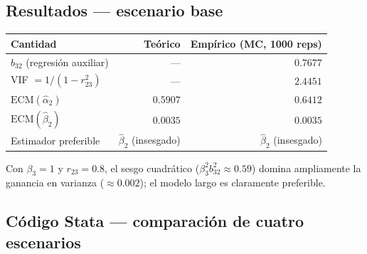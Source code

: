 \documentclass[12pt, letterpaper]{article}
\begin{document}
\subsection{Resultados --- escenario base}

\begin{center}
\renewcommand{\arraystretch}{1.3}
\small
\begin{tabular}{lrr}
\toprule
\textbf{Cantidad} & \textbf{Teórico} & \textbf{Empírico (MC, 1000 reps)} \\
\midrule
$b_{32}$ (regresión auxiliar)        & ---      & $0.7677$ \\
VIF $= 1/(1 - r_{23}^2)$             & ---      & $2.4451$ \\
\midrule
$\mathrm{ECM}(\hat{\alpha}_2)$        & $0.5907$ & $0.6412$ \\
$\mathrm{ECM}(\hat{\beta}_2)$         & $0.0035$ & $0.0035$ \\
\midrule
Estimador preferible & $\hat{\beta}_2$ (insesgado) & $\hat{\beta}_2$ (insesgado) \\
\bottomrule
\end{tabular}
\end{center}

Con $\beta_3 = 1$ y $r_{23} = 0.8$, el sesgo cuadrático
($\beta_3^2 b_{32}^2 \approx 0.59$) domina ampliamente la ganancia en
varianza ($\approx 0.002$); el modelo largo es claramente preferible.

\subsection{Código Stata --- comparación de cuatro escenarios}
\end{document}
